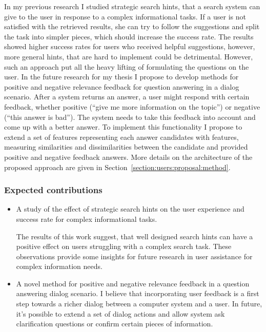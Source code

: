 In my previous research I studied strategic search hints, that a search system can give to the user in response to a complex informational tasks.
If a user is not satisfied with the retrieved results, she can try to follow the suggestions and split the task into simpler pieces, which should increase the success rate.
The results showed higher success rates for users who received helpful suggestions, however, more general hints, that are hard to implement could be detrimental.
However, such an approach put all the heavy lifting of formulating the questions on the user.
In the future research for my thesis I propose to develop methods for positive and negative relevance feedback for question answering in a dialog scenario.
After a system returns an answer, a user might respond with certain feedback, whether positive (\eg ``give me more information on the topic'') or negative (\eg ``this answer is bad'').
The system needs to take this feedback into account and come up with a better answer.
To implement this functionality I propose to extend a set of features representing each answer candidates with features, measuring similarities and dissimilarities between the candidate and provided positive and negative feedback answers.
More details on the architecture of the proposed approach are given in Section~\ref{section:users:proposal:method}.

\subsubsection{Expected contributions}
\label{section:proposal:plan:users:contributions}

\begin{itemize}
\item A study of the effect of strategic search hints on the user experience and success rate for complex informational tasks.

The results of this work suggest, that well designed search hints can have a positive effect on users struggling with a complex search task.
These observations provide some insights for future research in user assistance for complex information needs.

\item A novel method for positive and negative relevance feedback in a question answering dialog scenario. 
I believe that incorporating user feedback is a first step towards a richer dialog between a computer system and a user.
In future, it's possible to extend a set of dialog actions and allow system ask clarification questions or confirm certain pieces of information.
\end{itemize}

